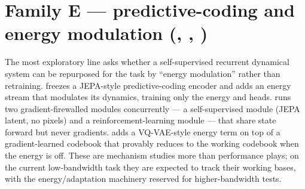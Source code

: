 \section{Family E --- predictive-coding and energy modulation (, , )}
The most exploratory line asks whether a self-supervised recurrent dynamical system can be
repurposed for the task by ``energy modulation'' rather than retraining.  freezes
a JEPA-style predictive-coding encoder and adds an energy stream that modulates its
dynamics, training only the energy and heads.  runs two gradient-firewalled
modules concurrently --- a self-supervised module (JEPA latent, no pixels) and a
reinforcement-learning module --- that share state forward but never gradients. 
adds a VQ-VAE-style energy term on top of a gradient-learned codebook that provably reduces
to the working codebook when the energy is off. These are mechanism studies more than
performance plays; on the current low-bandwidth task they are expected to track their
working bases, with the energy/adaptation machinery reserved for higher-bandwidth tests.

